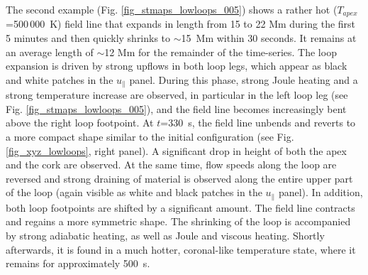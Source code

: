 \documentclass{aa}
\begin{document}
{%

The second example (Fig. \ref{fig_stmaps_lowloops_005}) shows a rather hot ($T_{apex}$=500\,000~K) field line that expands in length from 15 to 22 Mm during the first 5 minutes and then quickly shrinks to $\sim$15~Mm within 30 seconds. It remains at an average length of $\sim$12 Mm for the remainder of the time-series. %
The loop expansion is driven by strong upflows in both loop legs, which appear as black and white patches in the $u_{\parallel}$ panel. 
During this phase, strong Joule heating and a strong temperature increase are observed, in particular in the left loop leg (see Fig. \ref{fig_stmaps_lowloops_005}), and the field line becomes increasingly bent above the right loop footpoint. At $t$=330~s, the field line unbends and reverts to a more compact shape similar to the initial configuration (see Fig. \ref{fig_xyz_lowloops}, right panel). A significant drop in height of both the apex and the cork are observed. %
At the same time, flow speeds along the loop are reversed and strong draining of material is observed along the entire upper part of the loop (again visible as white and black patches in the $u_{\parallel}$ panel). 
In addition, both loop footpoints are shifted by a significant amount. The field line contracts and regains a more symmetric shape. The shrinking of the loop is accompanied by strong adiabatic heating, as well as Joule and viscous heating. Shortly afterwards, it is found in a much hotter, coronal-like temperature state, where it remains for approximately 500~s.

}
\end{document}
